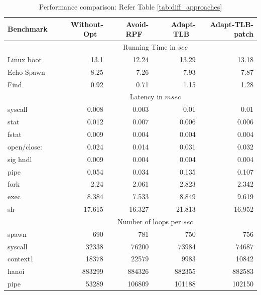 \documentclass[10pt,twocolumn]{article}
\begin{document}
\begin{table}
\centering
\caption{Performance comparison: Refer Table \ref{tab:diff_approaches}}
      \begin{tabular}{|l|  r r r r|} \hline
	         Benchmark\verb, ,& Without-Opt \verb, ,& Avoid-RPF \verb, , & Adapt-TLB \verb, ,& Adapt-TLB-patch \\ \hline

     & \multicolumn{4}{c|}{ Running Time in $sec$}\\ \cline {2-5}  
     Linux boot	&	13.1	&	12.24	&	13.29	&	13.18	\\
Echo Spawn	&	8.25	&	7.26	&	7.93	&	7.87	\\
Find	&	0.92	&	0.71	&	1.15	&	1.28	\\ \cline{2-5}
	   
     & \multicolumn{4}{c|}{Latency in $msec$}\\  \cline{2-5}
syscall	&	0.008	&	0.003	&	0.01	&	0.01	\\
stat	&	0.012	&	0.007	&	0.006	&	0.006	\\
fstat	&	0.009	&	0.004	&	0.004	&	0.004	\\
open/close:	&	0.024	&	0.014	&	0.031	&	0.032	\\
sig hndl	&	0.009	&	0.004	&	0.004	&	0.004	\\
pipe 	&	0.054	&	0.034	&	0.135	&	0.107	\\
fork	&	2.24	&	2.061	&	2.823	&	2.342	\\
exec	&	8.384	&	7.533	&	8.849	&	9.619	\\
sh	&	17.615	&	16.327	&	21.813	&	16.952	\\ \cline{2-5}
     & \multicolumn{4}{c|}{Number of loops per $sec$}\\  \cline{2-5}

spawn	&	690	&	781	&	750	&	756	\\
syscall	&	32338	&	76200	&	73984	&	74687	\\
context1	&	18378	&	22579	&	9983	&	10842	\\
hanoi	&	883299	&	884326	&	882355	&	882583	\\
pipe	&	53289	&	106809	&	101188	&	102150	\\
	

        \hline
      \end{tabular}
\label{tab:perf_approaches}
\end{table} 
\end{document}
